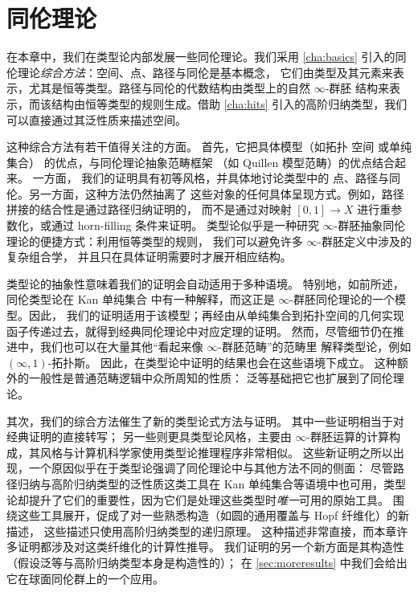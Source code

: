 \chapter{同伦理论}
\label{cha:homotopy}


在本章中，我们在类型论内部发展一些同伦理论。我们采用
\cref{cha:basics} 引入的同伦理论\emph{综合方法}：空间、点、路径与同伦是基本概念，
它们由类型及其元素来表示，尤其是恒等类型。路径与同伦的代数结构由类型上的自然
$\infty$-群胚
%
结构来表示，而该结构由恒等类型的规则生成。借助
\cref{cha:hits} 引入的高阶归纳类型，我们可以直接通过其泛性质来描述空间。

%
这种综合方法有若干值得关注的方面。
首先，它把具体模型（如拓扑
空间
或单纯集合）
的优点，与同伦理论抽象范畴框架
（如 Quillen 模型范畴）的优点结合起来。
一方面，
我们的证明具有初等风格，并具体地讨论类型中的
点、路径与同伦。另一方面，这种方法仍然抽离了
这些对象的任何具体呈现方式。例如，路径拼接的结合性是通过路径归纳证明的，
而不是通过对映射 $[0,1] \to X$ 进行重参数化，或通过 horn-filling 条件来证明。
类型论似乎是一种研究 $\infty$-群胚抽象同伦理论的便捷方式：利用恒等类型的规则，
我们可以避免许多 $\infty$-群胚定义中涉及的复杂组合学，
并且只在具体证明需要时才展开相应结构。

类型论的抽象性意味着我们的证明会自动适用于多种语境。
特别地，如前所述，同伦类型论在
Kan 单纯集合
中有一种解释，而这正是 $\infty$-群胚同伦理论的一个模型。因此，
我们的证明适用于该模型；再经由从单纯集合到拓扑空间的几何实现
函子传递过去，就得到经典同伦理论中对应定理的证明。
然而，尽管细节仍在推进中，我们也可以在大量其他“看起来像 $\infty$-群胚范畴”的范畴里
解释类型论，例如
$(\infty,1)$-拓扑斯。
因此，在类型论中证明的结果也会在这些语境下成立。
这种额外的一般性是普通范畴逻辑中众所周知的性质：
泛等基础把它也扩展到了同伦理论。

其次，我们的综合方法催生了新的类型论式方法与证明。
其中一些证明相当于对经典证明的直接转写；
另一些则更具类型论风格，主要由
$\infty$-群胚运算的计算构成，其风格与计算机科学家使用类型论推理程序非常相似。
这些新证明之所以出现，一个原因似乎在于类型论强调了同伦理论中与其他方法不同的侧面：
尽管路径归纳与高阶归纳类型的泛性质这类工具在 Kan 单纯集合等语境中也可用，类型
论却提升了它们的重要性，因为它们是处理这些类型时\emph{唯一}可用的原始工具。
围绕这些工具展开，促成了对一些熟悉构造（如圆的通用覆盖与 Hopf 纤维化）的新描述，
这些描述只使用高阶归纳类型的递归原理。
这种描述非常直接，而本章许多证明都涉及对这类纤维化的计算性推导。
%
我们证明的另一个新方面是其构造性（假设泛等与高阶归纳类型本身是构造性的）；
在 \cref{sec:moreresults} 中我们会给出它在球面同伦群上的一个应用。

